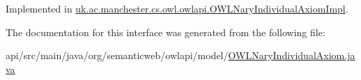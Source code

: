 Implemented in \hyperlink{classuk_1_1ac_1_1manchester_1_1cs_1_1owl_1_1owlapi_1_1_o_w_l_nary_individual_axiom_impl_aed19ea141facf5129b3c445612edcd22}{uk.\-ac.\-manchester.\-cs.\-owl.\-owlapi.\-O\-W\-L\-Nary\-Individual\-Axiom\-Impl}.



The documentation for this interface was generated from the following file\-:\begin{DoxyCompactItemize}
\item 
api/src/main/java/org/semanticweb/owlapi/model/\hyperlink{_o_w_l_nary_individual_axiom_8java}{O\-W\-L\-Nary\-Individual\-Axiom.\-java}\end{DoxyCompactItemize}

